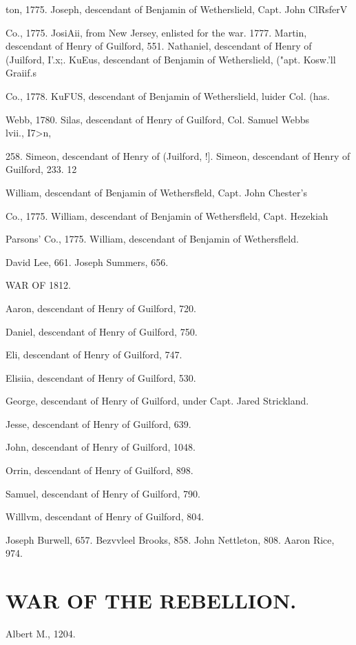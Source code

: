 ton, 1775. 
Joseph, descendant of Benjamin of Wetherslield, Capt. John ClRsferV 

Co., 1775. 
JosiAii, from New Jersey, enlisted for the war. 1777. 
Martin, descendant of Henry of Guilford, 551. 
Nathaniel, descendant of Henry of (Juilford, I'.x;. 
KuEus, descendant of Benjamin of Wetherslield, ("apt. Kosw.'ll Graiif.s 

Co., 1778. 
KuFUS, descendant of Benjamin of Wetherslield, luider Col. (has. 

Webb, 1780. 
Silas, descendant of Henry of Guilford, Col. Samuel Webbs \\lvii., I7>n, 

258. 
Simeon, descendant of Henry of (Juilford, !]. 
Simeon, descendant of Henry of Guilford, 233. 
12 




William, descendant of Benjamin of Wethersfleld, Capt. John Chester's 

Co., 1775. 
William, descendant of Benjamin of Wethersfleld, Capt. Hezekiah 

Parsons' Co., 1775. 
William, descendant of Benjamin of Wethersfleld. 

David Lee, 661. 
Joseph Summers, 656. 

WAR OF 1812. 

Aaron, descendant of Henry of Guilford, 720. 

Daniel, descendant of Henry of Guilford, 750. 

Eli, descendant of Henry of Guilford, 747. 

Elisiia, descendant of Henry of Guilford, 530. 

George, descendant of Henry of Guilford, under Capt. Jared Strickland. 

Jesse, descendant of Henry of Guilford, 639. 

John, descendant of Henry of Guilford, 1048. 

Orrin, descendant of Henry of Guilford, 898. 

Samuel, descendant of Henry of Guilford, 790. 

Willlvm, descendant of Henry of Guilford, 804. 

Joseph Burwell, 657. 
Bezvvleel Brooks, 858. 
John Nettleton, 808. 
Aaron Rice, 974. 

\chapter{WAR OF THE REBELLION.}
Albert M., 1204. 

